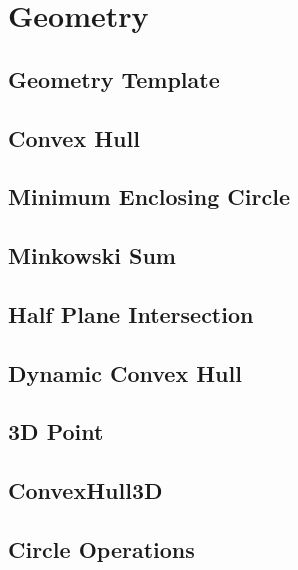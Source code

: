 \documentclass{article}
\begin{document}
\section{Geometry}

\subsection{Geometry Template}


\subsection{Convex Hull}


\subsection{Minimum Enclosing Circle}


\subsection{Minkowski Sum}


\subsection{Half Plane Intersection}


\subsection{Dynamic Convex Hull}


\subsection{3D Point}


\subsection{ConvexHull3D}


\subsection{Circle Operations}

\end{document}
